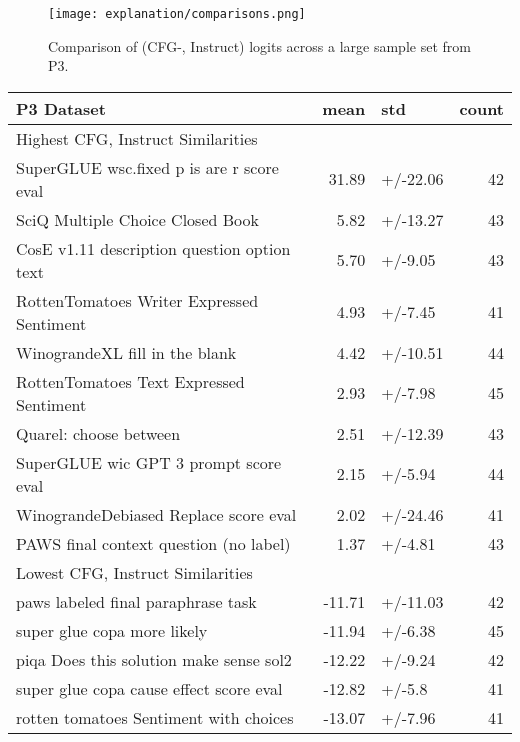 \documentclass{article}
\begin{document}
\begin{figure}[t]
    \centering
    \texttt{[image: explanation/comparisons.png]}
    \caption{Comparison of (CFG-, Instruct) logits across a large sample set from P3.}
    \label{fig:instruct-cfg-comparison-subplots}
\end{figure}

\begin{table}[t]
\centering
\begin{tabular}{lrlr}
\toprule
P3 Dataset &   mean &       std &  count \\
\midrule
Highest  CFG, Instruct Similarities&        &           &        \\
\midrule
SuperGLUE wsc.fixed p is are r score eval        &  31.89 &  +/-22.06 &     42 \\
SciQ Multiple Choice Closed Book                  &   5.82 &  +/-13.27 &     43 \\
CosE v1.11 description question option text      &   5.70 &   +/-9.05 &     43 \\
RottenTomatoes Writer Expressed Sentiment        &   4.93 &   +/-7.45 &     41 \\
WinograndeXL fill in the blank        &   4.42 &  +/-10.51 &     44 \\
RottenTomatoes Text Expressed Sentiment          &   2.93 &   +/-7.98 &     45 \\
Quarel: choose between                             &   2.51 &  +/-12.39 &     43 \\
SuperGLUE wic GPT 3 prompt score eval            &   2.15 &   +/-5.94 &     44 \\
WinograndeDebiased Replace score eval &   2.02 &  +/-24.46 &     41 \\
PAWS final context question (no label)      &   1.37 &   +/-4.81 &     43 \\
\midrule
Lowest  CFG, Instruct Similarities&        &           &        \\
\midrule
paws labeled final paraphrase task                & -11.71 &  +/-11.03 &     42 \\
super glue copa more likely                       & -11.94 &   +/-6.38 &     45 \\
piqa Does this solution make sense sol2           & -12.22 &   +/-9.24 &     42 \\
super glue copa cause effect score eval           & -12.82 &    +/-5.8 &     41 \\
rotten tomatoes Sentiment with choices            & -13.07 &   +/-7.96 &     41 \\

\end{tabular}
\end{table}
\end{document}
